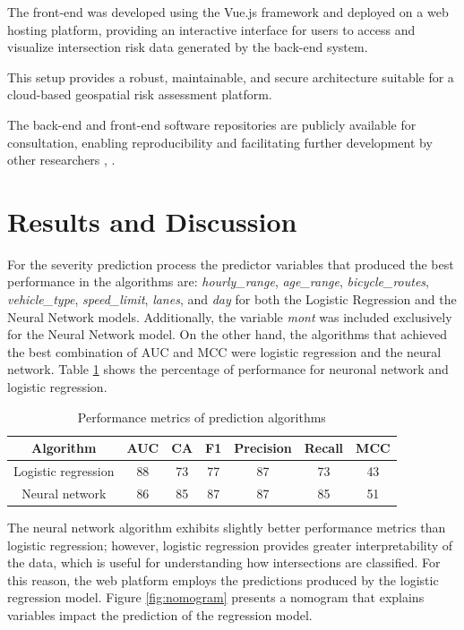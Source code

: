 \documentclass[preprint,12pt]{elsarticle}
\begin{document}
The front-end was developed using the Vue.js framework and deployed on a web hosting platform, providing an interactive interface for users to access and visualize intersection risk data generated by the back-end system.

This setup provides a robust, maintainable, and secure architecture suitable for a cloud-based geospatial risk assessment platform.

The back-end and front-end software repositories are publicly available for consultation, enabling reproducibility and facilitating further development by other researchers \cite{noauthor_general_nodate}, \cite{noauthor_general_nodate-1}.


\section{Results and Discussion}

For the severity prediction process the predictor variables that produced the best performance in the algorithms are: \textit{hourly\_range}, \textit{age\_range}, \textit{bicycle\_routes}, \textit{vehicle\_type}, \textit{speed\_limit}, \textit{lanes}, and \textit{day} for both the Logistic Regression and the Neural Network models. Additionally, the variable \textit{mont} was included exclusively for the Neural Network model. On the other hand, the algorithms that achieved the best combination of AUC and MCC were logistic regression and the neural network.
Table \ref{tab:metrics} shows the percentage of performance for neuronal network and logistic regression.

\begin{table}[H]
\centering
\caption{Performance metrics of prediction algorithms }
\begin{tabular}{|c|c|c|c|c|c|c|}
\hline
\textbf{Algorithm} & \textbf{AUC} & \textbf{CA}& \textbf{F1} & \textbf{Precision} & \textbf{Recall} & \textbf{MCC} \\ \hline Logistic regression
& 88 & 73 & 77 & 87 &73 & 43 \\ \hline
Neural network & 86 & 85 & 87 & 87 & 85 &51 \\ \hline
\end{tabular}
\label{tab:metrics}
\end{table}


The neural network algorithm exhibits slightly better performance metrics than logistic regression; however, logistic regression provides greater interpretability of the data, which is useful for understanding how intersections are classified. For this reason, the web platform employs the predictions produced by the logistic regression model. Figure \ref{fig:nomogram} presents a nomogram that explains variables impact the prediction of the regression model. 
\end{document}
